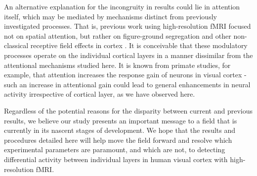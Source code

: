 An alternative explanation for the incongruity in results could lie in attention itself, which may be mediated by mechanisms distinct from previously investigated processes. That is, previous work using high-resolution fMRI focused not on spatial attention, but rather on figure-ground segregation \cite{Kok2016} and other non-classical receptive field effects in cortex \cite{Muckli2015}. It is conceivable that these modulatory processes operate on the individual cortical layers in a manner dissimilar from the attentional mechanisms studied here. It is known from primate studies, for example, that attention increases the response gain of neurons in visual cortex \cite{Treue1999,MartinezTrujillo2004} - such an increase in attentional gain could lead to general enhancements in neural activity irrespective of cortical layer, as we have observed here.
	
Regardless of the potential reasons for the disparity between current and previous results, we believe our study presents an important message to a field that is currently in its nascent stages of development. We hope that the results and procedures detailed here will help move the field forward and resolve which experimental parameters are paramount, and which are not, to detecting differential activity between individual layers in human visual cortex with high-resolution fMRI.
